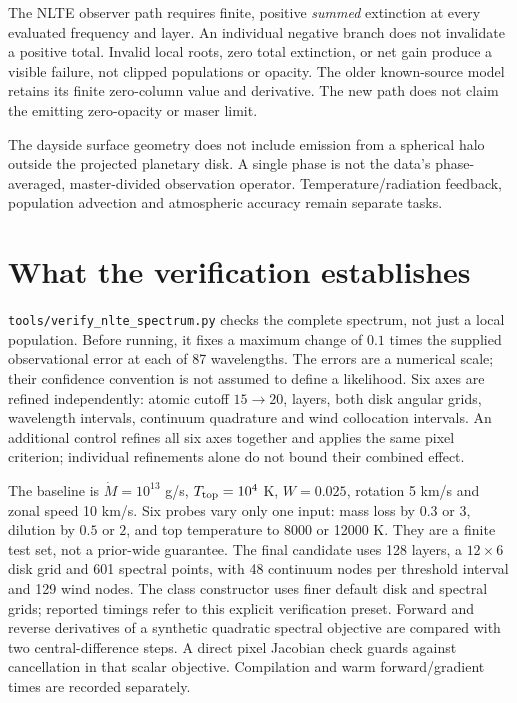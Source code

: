 \documentclass[10pt,a4paper]{article}
\begin{document}
The NLTE observer path requires finite, positive \emph{summed} extinction at
every evaluated frequency and layer. An individual negative branch does not
invalidate a positive total. Invalid local roots, zero total extinction, or net
gain produce a visible failure, not clipped populations or opacity. The older
known-source model retains its finite zero-column value and derivative. The
new path does not claim the emitting zero-opacity or maser limit.

The dayside surface geometry does not include emission from a spherical halo
outside the projected planetary disk. A single phase is not the data's
phase-averaged, master-divided observation operator. Temperature/radiation
feedback, population advection and atmospheric accuracy remain separate tasks.

\section{What the verification establishes}
\texttt{tools/verify\_nlte\_spectrum.py} checks the complete spectrum, not just
a local population. Before running, it fixes a maximum change of $0.1$ times
the supplied observational error at each of 87 wavelengths. The errors are a
numerical scale; their confidence convention is not assumed to define a
likelihood. Six axes are refined independently: atomic cutoff $15\to20$,
layers, both disk angular grids, wavelength intervals, continuum quadrature
and wind collocation intervals. An additional control refines all six axes
together and applies the same pixel criterion; individual refinements alone
do not bound their combined effect.

The baseline is $\dot M=10^{13}$ g/s, $T_{\rm top}=10^4$ K, $W=0.025$,
rotation 5 km/s and zonal speed 10 km/s. Six probes vary only one input:
mass loss by $0.3$ or $3$, dilution by $0.5$ or $2$, and top temperature to
8000 or 12000 K. They are a finite test set, not a prior-wide guarantee.
The final candidate uses 128 layers, a $12\times6$ disk grid and 601 spectral
points, with 48 continuum nodes per threshold interval and 129 wind nodes.
The class constructor uses finer default disk and spectral grids; reported
timings refer to this explicit verification preset.
Forward and reverse derivatives of a synthetic quadratic spectral objective
are compared with two central-difference steps. A direct pixel Jacobian check
guards against cancellation in that scalar objective. Compilation and warm
forward/gradient times are recorded separately.
\end{document}

